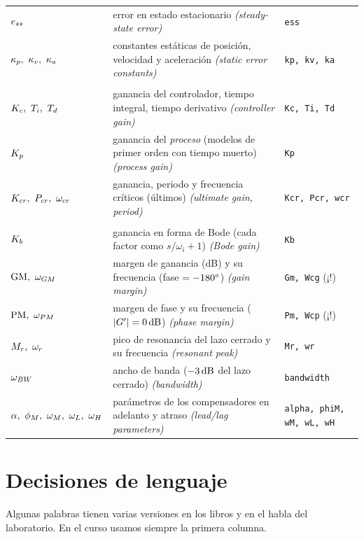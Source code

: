 {\begin{xltabular}{\linewidth}{@{}>{\raggedright\arraybackslash}p{2.9cm} >{\raggedright\arraybackslash}X >{\raggedright\arraybackslash\ttfamily\footnotesize}p{2.5cm}@{}}
$e_{ss}$ & error en estado estacionario \textcolor{ctrlgris}{\textit{(steady-state error)}} & \texttt{ess}\\
$\kappa_p,\ \kappa_v,\ \kappa_a$ & constantes estáticas de posición, velocidad y aceleración \textcolor{ctrlgris}{\textit{(static error constants)}} & \texttt{kp, kv, ka}\\
\midrule
{}\\
$K_c,\ T_i,\ T_d$ & ganancia del controlador, tiempo integral, tiempo derivativo \textcolor{ctrlgris}{\textit{(controller gain)}} & \texttt{Kc, Ti, Td}\\
$K_p$ & ganancia del \emph{proceso} (modelos de primer orden con tiempo muerto) \textcolor{ctrlgris}{\textit{(process gain)}} & \texttt{Kp}\\
$K_{cr},\ P_{cr},\ \omega_{cr}$ & ganancia, periodo y frecuencia críticos (últimos) \textcolor{ctrlgris}{\textit{(ultimate gain, period)}} & \texttt{Kcr, Pcr, wcr}\\
\midrule
{}\\
$K_b$ & ganancia en forma de Bode (cada factor como $s/\omega_i+1$) \textcolor{ctrlgris}{\textit{(Bode gain)}} & \texttt{Kb}\\
$\mathrm{GM},\ \omega_{GM}$ & margen de ganancia (dB) y su frecuencia (fase $=-180^{\circ}$) \textcolor{ctrlgris}{\textit{(gain margin)}} & \texttt{Gm, Wcg} (¡!)\\
$\mathrm{PM},\ \omega_{PM}$ & margen de fase y su frecuencia ($|G'|=0\,\mathrm{dB}$) \textcolor{ctrlgris}{\textit{(phase margin)}} & \texttt{Pm, Wcp} (¡!)\\
$M_r,\ \omega_r$ & pico de resonancia del lazo cerrado y su frecuencia \textcolor{ctrlgris}{\textit{(resonant peak)}} & \texttt{Mr, wr}\\
$\omega_{BW}$ & ancho de banda ($-3\,\mathrm{dB}$ del lazo cerrado) \textcolor{ctrlgris}{\textit{(bandwidth)}} & \texttt{bandwidth}\\
$\alpha,\ \phi_M,\ \omega_M,\ \omega_L,\ \omega_H$ & parámetros de los compensadores en adelanto y atraso \textcolor{ctrlgris}{\textit{(lead/lag parameters)}} & \texttt{alpha, phiM, wM, wL, wH}\\
\bottomrule
\end{xltabular}}

\section*{Decisiones de lenguaje}

Algunas palabras tienen varias versiones en los libros y en el habla del laboratorio. En el curso usamos siempre la primera columna.

